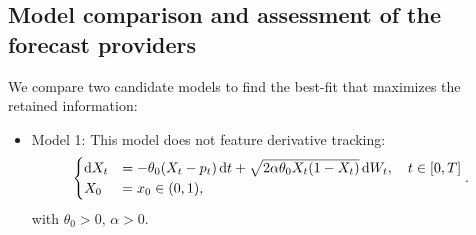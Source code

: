 \documentclass[11pt]{article}
\theoremstyle{definition}
\begin{document}
\subsection{Model comparison and assessment of the forecast providers} \label{Model_Comp}

We compare two candidate models to find the best-fit that maximizes the retained information:
\begin{itemize}
  \item Model 1: This model does not feature derivative tracking:
\begin{equation}
\begin{cases}
\dif X_t&=-\theta_0 (X_t - p_t) \dif t +\sqrt{2 \alpha \theta_0 X_t (1 - X_t)} \dif W_t, \quad t \in [0,T]  \\
X_0&=x_0\in (0,1),
\end{cases}.  \label{Model1}
\end{equation}
 with $\theta_0 > 0, \, \alpha > 0$.

%  


\end{itemize}
\end{document}
